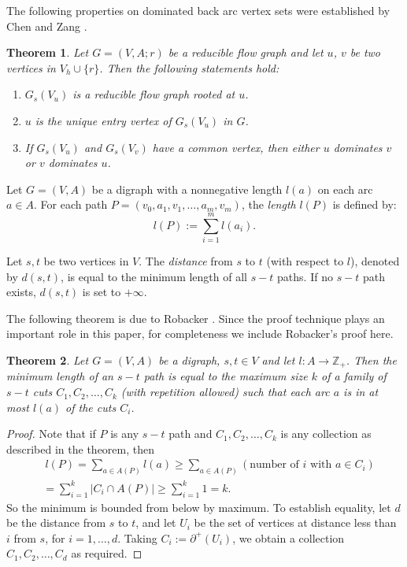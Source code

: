 \documentclass[11pt]{article}
\newtheorem{theorem}{Theorem}[section]
\begin{document}
The following properties on dominated back arc vertex sets were established by Chen and Zang \cite{CheZ}.

\begin{theorem}
\label{thm:2}
Let $G=(V,A;r)$ be a reducible flow graph and let $u$, $v$ be two vertices in $V_h\cup\{r\}$. Then the following statements hold:
\begin{enumerate}[label=\emph{(}\alph*\emph{)}]
  \item $G_s(V_u)$ is a reducible flow graph rooted at $u$.
  \item $u$ is the unique entry vertex of $G_s(V_u)$ in $G$.
  \item If $G_s(V_u)$ and $G_s(V_v)$ have a common vertex, then either $u$ dominates $v$ or $v$ dominates $u$.
\end{enumerate}
\end{theorem}

Let $G=(V,A)$ be a digraph with a nonnegative length $l(a)$ on each arc $a\in A$. For each path $P=(v_0,a_1,v_1,\dots,a_m,v_m)$, the \emph{length} $l(P)$ is defined by:
\begin{equation*}
l(P):=\sum_{i=1}^m l(a_i).
\end{equation*}

Let $s,t$ be two vertices in $V$. The \emph{distance} from $s$ to $t$ (with respect to $l$), denoted by $d(s,t)$, is equal to the minimum length of all $s-t$ paths. If no $s-t$ path exists, $d(s,t)$ is set to $+\infty$.

The following theorem is due to Robacker \cite{Roba}. Since the proof technique plays an important role in this paper, for completeness we include Robacker's proof here.
\begin{theorem}
\label{thm:3}
Let $G=(V,A)$ be a digraph, $s,t\in V$ and let $l:A\rightarrow \mathbb{Z}_+$. Then the minimum length of an $s-t$ path is equal to the maximum size $k$ of a family of $s-t$ cuts $C_1,C_2,\dots,C_k$ (with repetition allowed) such that each arc $a$ is in at most $l(a)$ of the cuts $C_i$.
\end{theorem}
\begin{proof}
Note that if $P$ is any $s-t$ path and $C_1,C_2,\dots,C_k$ is any collection as described in the theorem, then
\begin{equation*}
\begin{split}
&~ l(P)=\sum_{a\in A(P)}l(a)\geq \sum_{a\in A(P)}(\mbox{number of $i$ with $a\in C_i$})\\
&=\sum_{i=1}^k\lvert C_i\cap A(P)\rvert \geq \sum_{i=1}^k 1=k.
\end{split}
\end{equation*}
So the minimum is bounded from below by maximum. To establish equality, let $d$ be the distance from $s$ to $t$, and let $U_i$ be the set of vertices at distance less than $i$ from $s$, for $i=1,\dots,d$. Taking $C_i:=\partial^+(U_i)$, we obtain a collection $C_1,C_2,\dots,C_d$ as required.
\end{proof}
\end{document}
